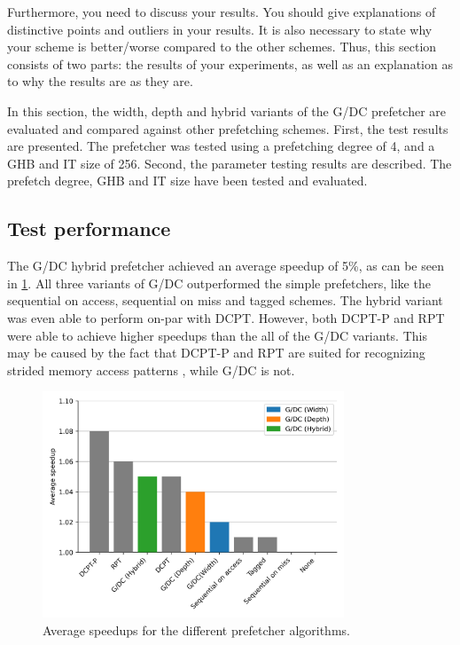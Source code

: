 \documentclass[conference]{IEEEtran}
\begin{document}
Furthermore, you need to discuss your results. You should give explanations of distinctive points and outliers in your results. It is also necessary to state why your scheme is better/worse compared to the other schemes. Thus, this section consists of two parts: the results of your experiments, as well as an explanation as to why the results are as they are.
\fi

In this section, the width, depth and hybrid variants of the G/DC prefetcher are evaluated and compared against other prefetching schemes. First, the test results are presented. The prefetcher was tested using a prefetching degree of 4, and a GHB and IT size of 256. Second, the parameter testing results are described. The prefetch degree, GHB and IT size have been tested and evaluated. 

\subsection{Test performance}

The G/DC hybrid prefetcher achieved an average speedup of 5\%, as can be seen in \cref{fig:comparison}. All three variants of G/DC outperformed the simple prefetchers, like the sequential on access, sequential on miss and tagged schemes. The hybrid variant was even able to perform on-par with DCPT. However, both DCPT-P and RPT were able to achieve higher speedups than the all of the G/DC variants. This may be caused by the fact that DCPT-P and RPT are suited for recognizing strided memory access patterns \cite{dcpt}, while G/DC is not. 

\begin{figure}[H]
    \centering
     \includegraphics[width=90mm]{assets/comparison.png}
    \vspace{-7mm}
    \caption{Average speedups for the different prefetcher algorithms. }
    \label{fig:comparison}
    \vspace{-2mm}
\end{figure}
\end{document}
